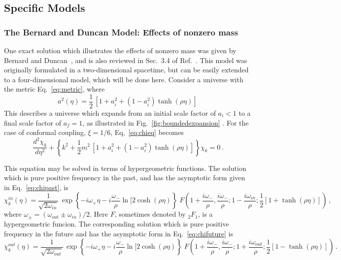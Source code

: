 \documentclass[eqsecnum,floats,aps,prd,floatfix,titlepage,tightenlines]{revtex4}
\begin{document}
\subsection{Specific Models}
\label{sec:specific}

\subsubsection{The Bernard and Duncan Model: Effects of nonzero mass}
\label{sec:BD}
 One exact solution which illustrates the effects of nonzero mass was given by Bernard and 
 Duncan~\cite{BeDu}, and is also reviewed in Sec.~3.4 of  Ref.~\cite{BD}. This model was 
 originally formulated in a two-dimensional spacetime, but can be easily extended to a four-dimensional model, 
 which will be done here. Consider a universe with the metric  Eq.~\eqref{eq:metric}, where
  \begin{equation}
 a^2(\eta) = \frac{1}{2}\, [1 + a_i^2 +(1-a_i^2) \tanh(\rho \eta)]\,
 \label{eq:BD-scale}
 \end{equation}
This describes a universe which expands from an initial scale factor of $a_i < 1$ to a final
scale factor of $a_f =1$, as illustrated in Fig.~\ref{fig:boundedexpansion}  . For the case of conformal coupling, $\xi =1/6$,
Eq,~\eqref{eq:chieq} becomes
 \begin{equation}
 {\frac{d^2\chi_k}{d\eta^2}} + \left\{ k^2 +  \frac{1}{2} m^2\, \left[1 + a_i^2 +(1-a_i^2) \tanh(\rho \eta)\right]\right\}\chi_{k} =0 \, .
                                                 \label{eq:chieq-BD}
 \end{equation} 

This equation may be solved in terms of hypergeometric functions. The solution which is pure positive 
frequency in the past, and has the asymptotic form given in Eq.~\eqref{eq:chipast}, is
 \begin{equation}
 \chi^{in}_k(\eta) =    \frac{1}{\sqrt{2\omega_{in}}}\, \exp\left\{-i \omega_{+}   \eta - i \frac{\omega_{-}}{ \rho} \ln[2 \cosh(\rho \eta) \right\}\;
 F\left(1+\frac{i \omega_{-}}{\rho}, \frac{i \omega_{-}}{\rho}; 1-\frac{i \omega_{in}}{\rho}; 
\frac{1}{2} [1+ \tanh(\rho \eta)] \right)\,,
\label{eq:chi-in}
 \end{equation}
 where $\omega_\pm = (\omega_{out} \pm \omega_{in})/2$. Here $F$, sometimes denoted by ${}_2F_1$, is a hypergeometric funcion.
The corresponding solution which  is pure positive  frequency in the future and has the asymptotic form in Eq.~\eqref{eq:chifuture} is
 \begin{equation}
 \chi^{out}_k(\eta) =  \frac{1}{\sqrt{2\omega_{out}}}\, \exp\left\{-i \omega_{+}   \eta - i \frac{\omega_{-}}{ \rho} \ln[2 \cosh(\rho \eta) \right\}\;
 F\left(1+\frac{i \omega_{-}}{\rho}, \frac{i \omega_{-}}{\rho}; 1 + \frac{i \omega_{out}}{\rho}; 
\frac{1}{2} [1- \tanh(\rho \eta)] \right)\,.
\label{eq:chi-out}
 \end{equation}
 
\end{document}
